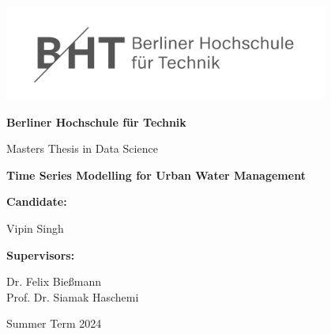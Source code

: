 \begin{titlepage}
    \begin{center}
        \vspace*{1cm}

        \includegraphics[width=0.8\textwidth]{bht_logo}

        \vspace*{1cm}

        \LARGE
        \textbf{Berliner Hochschule für Technik}

        \vspace{0.5cm}
        \LARGE
        Masters Thesis in Data Science

        \vspace*{1.5cm}
            
        \Huge
        \textbf{Time Series Modelling for Urban Water Management}
            
                    
        \vspace{2cm}

        \Large
        \begin{minipage}[t]{0.4\textwidth}
             \textbf{Candidate:}
        \end{minipage}
        \hfill
        \begin{minipage}[t]{0.45\textwidth}
            \raggedleft
            Vipin Singh
        \end{minipage}
            
            
        \vspace{2cm}
            
           
        \Large
        \begin{minipage}[t]{0.4\textwidth}
             \textbf{Supervisors:}
        \end{minipage}
        \hfill
        \begin{minipage}[t]{0.45\textwidth}
            \raggedleft
            Dr. Felix Bießmann\\
            Prof. Dr. Siamak Haschemi\\
        \end{minipage}
        
        \vspace{3cm}
        Summer Term 2024
            
    \end{center}
\end{titlepage}